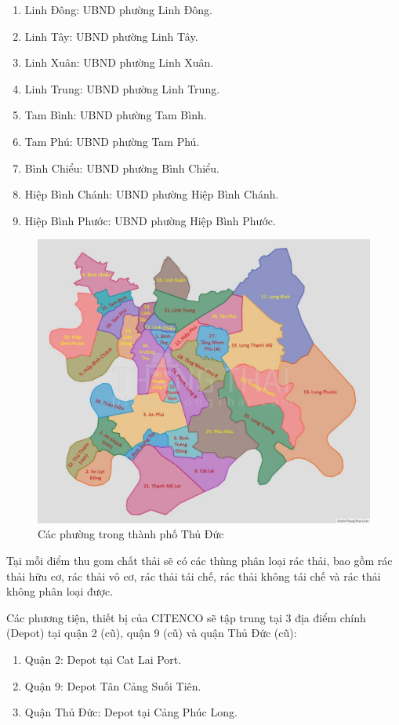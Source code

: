 \begin{enumerate}
            \item Linh Đông: UBND phường Linh Đông.
            \item Linh Tây: UBND phường Linh Tây.
            \item Linh Xuân: UBND phường Linh Xuân.
            \item Linh Trung: UBND phường Linh Trung.
            \item Tam Bình: UBND phường Tam Bình.
            \item Tam Phú: UBND phường Tam Phú.
            \item Bình Chiểu: UBND phường Bình Chiểu.
            \item Hiệp Bình Chánh: UBND phường Hiệp Bình Chánh.
            \item Hiệp Bình Phước: UBND phường Hiệp Bình Phước.
        \end{enumerate}

        \newpage
        \begin{figure}[h]
            \centering
            \includegraphics[width=1\linewidth]{imgs/map.jpg}
            \caption{Các phường trong thành phố Thủ Đức}
        \end{figure}

        \quad Tại mỗi điểm thu gom chất thải sẽ có các thùng phân loại rác thải, bao gồm rác thải hữu cơ, rác thải vô cơ, rác thải tái chế, rác thải không tái chế và rác thải không phân loại được.

        \quad Các phương tiện, thiết bị của CITENCO sẽ tập trung tại 3 địa điểm chính (Depot) tại quận 2 (cũ), quận 9 (cũ) và quận Thủ Đức (cũ):
        \begin{enumerate}
            \item Quận 2: Depot tại Cat Lai Port.
            \item Quận 9: Depot Tân Cảng Suối Tiên.
            \item Quận Thủ Đức: Depot tại Cảng Phúc Long.
        \end{enumerate}

